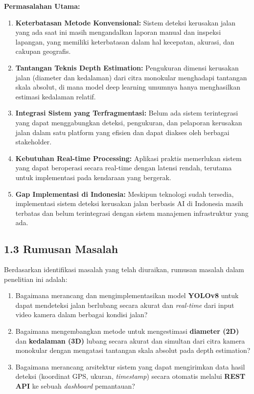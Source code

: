 \documentclass[12pt,a4paper]{article}
\begin{document}
\textbf{Permasalahan Utama:}
\begin{enumerate}
    \item \textbf{Keterbatasan Metode Konvensional:} Sistem deteksi kerusakan jalan yang ada saat ini masih mengandalkan laporan manual dan inspeksi lapangan, yang memiliki keterbatasan dalam hal kecepatan, akurasi, dan cakupan geografis.
    \item \textbf{Tantangan Teknis Depth Estimation:} Pengukuran dimensi kerusakan jalan (diameter dan kedalaman) dari citra monokular menghadapi tantangan skala absolut, di mana model deep learning umumnya hanya menghasilkan estimasi kedalaman relatif.
    \item \textbf{Integrasi Sistem yang Terfragmentasi:} Belum ada sistem terintegrasi yang dapat menggabungkan deteksi, pengukuran, dan pelaporan kerusakan jalan dalam satu platform yang efisien dan dapat diakses oleh berbagai stakeholder.
    \item \textbf{Kebutuhan Real-time Processing:} Aplikasi praktis memerlukan sistem yang dapat beroperasi secara real-time dengan latensi rendah, terutama untuk implementasi pada kendaraan yang bergerak.
    \item \textbf{Gap Implementasi di Indonesia:} Meskipun teknologi sudah tersedia, implementasi sistem deteksi kerusakan jalan berbasis AI di Indonesia masih terbatas dan belum terintegrasi dengan sistem manajemen infrastruktur yang ada.
\end{enumerate}

\subsection*{1.3 Rumusan Masalah}
Berdasarkan identifikasi masalah yang telah diuraikan, rumusan masalah dalam penelitian ini adalah:
\begin{enumerate}
    \item Bagaimana merancang dan mengimplementasikan model \textbf{YOLOv8} untuk dapat mendeteksi jalan berlubang secara akurat dan \textit{real-time} dari input video kamera dalam berbagai kondisi jalan?
    \item Bagaimana mengembangkan metode untuk mengestimasi \textbf{diameter (2D)} dan \textbf{kedalaman (3D)} lubang secara akurat dan simultan dari citra kamera monokular dengan mengatasi tantangan skala absolut pada depth estimation?
    \item Bagaimana merancang arsitektur sistem yang dapat mengirimkan data hasil deteksi (koordinat GPS, ukuran, \textit{timestamp}) secara otomatis melalui \textbf{REST API} ke sebuah \textit{dashboard} pemantauan?
\end{enumerate}
\end{document}
